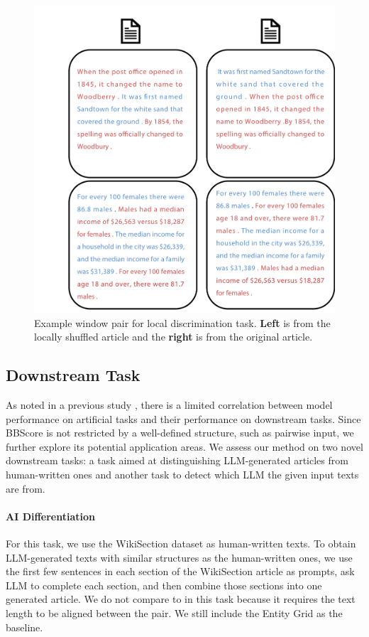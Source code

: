 \documentclass[letterpaper]{article}
\begin{document}
\begin{figure}[t!]
\centering
\includegraphics[width=\linewidth,trim={2.9cm 0 0 3.5cm},clip]{pictures/documents.pdf}
\caption{Example window pair for local discrimination task. \textbf{Left} is from the locally shuffled article and the \textbf{right} is from the original article.}
\label{Figure:local_exp}
\end{figure}



\subsection{Downstream Task}\label{exp:down}
As noted in a previous study \citep{mohiuddin-etal-2021-rethinking}, there is a limited correlation between model performance on artificial tasks and their performance on downstream tasks. Since BBScore is not restricted by a well-defined structure, such as pairwise input, we further explore its potential application areas. We assess our method on two novel downstream tasks: a task aimed at distinguishing LLM-generated articles from human-written ones and another task to detect which LLM the given input texts are from.

\paragraph{AI Differentiation} For this task, we use the WikiSection dataset as human-written texts. To obtain LLM-generated texts with similar structures as the human-written ones, we use the first few sentences in each section of the WikiSection article as prompts, ask LLM to complete each section, and then combine those sections into one generated article. We do not compare to \citet{moon-etal-2019-unified} in this task because it requires the text length to be aligned between the pair. We still include the Entity Grid as the baseline.
\end{document}
